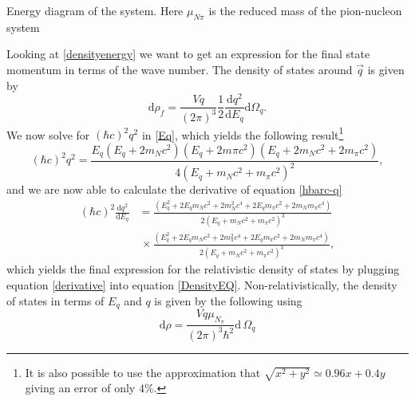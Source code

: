 \begin{marginfigure}
	\centering
	
	\caption{Energy diagram of the system. Here $\mu_{N\pi}$ is the reduced mass of the pion-nucleon system}
	\label{fig:qenergy}
\end{marginfigure}
Looking at \eqref{densityenergy} we want to get an expression for the final state momentum in terms of the wave number. The density of states around $\vec{q}$ is given by
\begin{equation} \label{DensityEQ}
	\text{d}\rho_f = \frac{Vq}{(2\pi)^3}\frac{1}{2}\frac{\text{d}q^2}{\text{d}E_q} \text{d}\Omega_q.
\end{equation}
We now solve for $(\hbar c)^2q^2$ in \eqref{Eq}, which yields the following result\footnote{It is also possible to use the approximation that $\sqrt{x^2+y^2}\simeq 0.96x+0.4y$ giving an error of only $4\%$.}
\begin{equation} \label{hbarc-q}
	(\hbar c)^2 q^2 = \frac{E_q(E_q+2m_N c^2)(E_q+2m\pi c^2)(E_q+2m_N c^2+2m_\pi c^2)}{4(E_q+m_N c^2+m_\pi c^2)^2},
\end{equation}
and we are now able to calculate the derivative of equation \eqref{hbarc-q}
\begin{equation}\begin{split} \label{derivative}
		(\hbar c)^2\frac{\text{d}q^2}{\text{d}E_q} &= \frac{(E_q^2+2E_q m_N c^2+2m_N^2 c^4+2E_q m_\pi c^2+2m_N m_\pi c^4)}{2(E_q+m_N c^2+m_\pi c^2)^3} \\
		& \, \times \frac{(E_q^2+2E_q m_N c^2 +2m_\pi^2 c^4 +2E_q m_\pi c^2+2m_N m_\pi c^4)}{2(E_q+m_N c^2+m_\pi c^2)^3},
	\end{split}
\end{equation} 
which yields the final expression for the relativistic density of states by plugging equation \eqref{derivative} into equation \eqref{DensityEQ}. Non-relativistically, the density of states in terms of $E_q$ and $q$ is given by the following using 
\begin{equation}\label{nonreladensity}
	\text{d}\rho = \frac{Vq\mu_{N_\pi}}{(2\pi)^3\hbar^2} \text{d}\,\Omega_q
\end{equation}